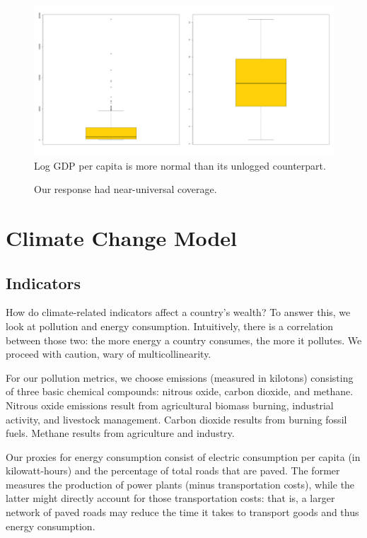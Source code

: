 \documentclass[12pt]{article}
\begin{document}
\begin{figure}[h!]
  \centering
  \includegraphics[width=\textwidth]{images/gdp_transform}
  \caption{\label{gdp_transform}Log GDP per capita is more normal than its unlogged counterpart.}
\end{figure}

\begin{figure}[h!]
  \centering
  \caption{\label{gdp_per_capita_heat_map}Our response had near-universal coverage.}
\end{figure}



\section{Climate Change Model}

\subsection{Indicators}
How do climate-related indicators affect a country's wealth? To answer this, we look at pollution and energy consumption. Intuitively, there is a correlation between those two: the more energy a country consumes, the more it pollutes. We proceed with caution, wary of multicollinearity.

For our pollution metrics, we choose emissions (measured in kilotons) consisting of three basic chemical compounds: nitrous oxide, carbon dioxide, and methane. Nitrous oxide emissions result from agricultural biomass burning, industrial activity, and livestock management. Carbon dioxide results from burning fossil fuels. Methane results from agriculture and industry.

Our proxies for energy consumption consist of electric consumption per capita (in kilowatt-hours) and the percentage of total roads that are paved. The former measures the production of power plants (minus transportation costs), while the latter might directly account for those transportation costs: that is, a larger network of paved roads may reduce the time it takes to transport goods and thus energy consumption.
\end{document}
